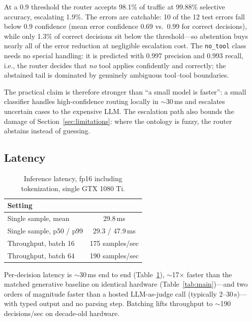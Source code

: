 \documentclass{article}
\begin{document}
At a 0.9 threshold the router accepts 98.1\% of traffic at 99.88\% selective
accuracy, escalating 1.9\%. The errors are catchable: 10 of the 12 test errors
fall below 0.9 confidence (mean error confidence 0.69 vs.\ 0.99 for correct
decisions), while only 1.3\% of correct decisions sit below the threshold---so
abstention buys nearly all of the error reduction at negligible escalation
cost. The \texttt{no\_tool} class needs no special handling: it is predicted
with 0.997 precision and 0.993 recall, i.e., the router decides that
\emph{no} tool applies confidently and correctly; the abstained tail is
dominated by genuinely ambiguous tool--tool boundaries.

The practical claim is therefore stronger than ``a small model is faster'':
a small classifier handles high-confidence routing locally in $\sim$30\,ms
and escalates uncertain cases to the expensive LLM. The escalation path also
bounds the damage of Section~\ref{sec:limitations}: where the ontology is
fuzzy, the router abstains instead of guessing.

\subsection{Latency}
\label{sec:latency}

\begin{table}[t]
  \centering
  \caption{Inference latency, fp16 including tokenization, single GTX 1080 Ti.}
  \label{tab:latency}
  \begin{tabular}{lc}
    \toprule
    Setting & \\
    \midrule
    Single sample, mean & 29.8\,ms \\
    Single sample, p50 / p99 & 29.3 / 47.9\,ms \\
    Throughput, batch 16 & 175 samples/sec \\
    Throughput, batch 64 & 190 samples/sec \\
    \bottomrule
  \end{tabular}
\end{table}

Per-decision latency is $\sim$30\,ms end to end (Table~\ref{tab:latency}),
$\sim$17$\times$ faster than the matched generative baseline on identical
hardware (Table~\ref{tab:main})---and two orders of magnitude faster than a
hosted LLM-as-judge call (typically 2--30\,s)---with typed output and no
parsing step. Batching
lifts throughput to $\sim$190 decisions/sec on decade-old hardware.
\end{document}
